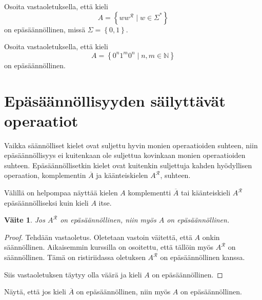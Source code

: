 \documentclass[a4paper,11pt]{article}
\newtheorem*{claim}{Väite}
\theoremstyle{definition}
\newcommand{\set}[1]{{\left\{ #1 \right\}}}
\newcommand{\Nat}{\mathbb{N}}
\begin{document}
\begin{exercise}
    Osoita vastaoletuksella, että kieli
    \begin{equation*}
        A = \set{ww^{\mathcal{R}} \mid w \in \Sigma^*}
    \end{equation*}
    on epäsäännöllinen, missä $\Sigma = \set{0,1}$.
\end{exercise}

\begin{exercise}
    Osoita vastaoletuksella, että kieli
    \begin{equation*}
        A = \set{0^n1^m0^n \mid n,m \in \Nat}
    \end{equation*}
    on epäsäännöllinen.
\end{exercise}

\section*{Epäsäännöllisyyden säilyttävät operaatiot}

Vaikka säännölliset kielet ovat suljettu hyvin monien operaatioiden
suhteen, niin e\-pä\-sään\-nöl\-li\-syys ei kuitenkaan ole suljettua
kovinkaan monien operaatioiden suhteen. Epäsään\-nöl\-lisetkin kielet
ovat kuitenkin suljettuja kahden hyödyllisen operaation,
komp\-le\-men\-tin $\overline{A}$ ja käänteiskielen $A^\mathcal{R}$,
suhteen.

Välillä on helpompaa näyttää kielen $A$ komplementti $\overline{A}$
tai käänteiskieli $A^\mathcal{R}$ e\-pä\-sään\-nöl\-li\-sek\-si kuin
kieli $A$ itse.

\begin{claim}
    Jos $A^\mathcal{R}$ on epäsäännöllinen, niin myös $A$ on
    epä\-sään\-nöl\-li\-nen.
\end{claim}
\begin{proof}
    Tehdään vastaoletus. Oletetaan vastoin väitettä, et\-tä $A$ onkin
    säännöllinen. Aikaisemmin kurssilla on osoitettu, että tällöin myös
    $A^\mathcal{R}$ on säännöllinen. Tämä on ristiriidassa oletuksen
    $A^\mathcal{R}$ on epäsäännöllinen kanssa.

    Siis vastaoletuksen täytyy olla väärä ja kieli $A$ on epä\-sään\-nöl\-li\-nen.
\end{proof}

\begin{exercise}
    Näytä, että jos kieli $\overline{A}$ on epä\-sään\-nöl\-li\-nen, niin myös $A$ on
    epäsäännöllinen.
\end{exercise}
\end{document}
